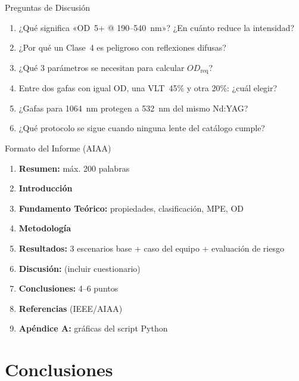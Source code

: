 \documentclass[aspectratio=169,12pt]{beamer}
\begin{document}
\begin{frame}{Preguntas de Discusión}
	\begin{enumerate}
		\item ¿Qué significa «OD~5+ @ 190--540~nm»? ¿En cuánto reduce la intensidad?
		\item ¿Por qué un Clase~4 es peligroso con reflexiones difusas?
		\item ¿Qué 3 parámetros se necesitan para calcular $OD_\mathrm{req}$?
		\item Entre dos gafas con igual OD, una VLT~45\% y otra 20\%: ¿cuál elegir?
		\item ¿Gafas para 1064~nm protegen a 532~nm del mismo Nd:YAG?
		\item ¿Qué protocolo se sigue cuando ninguna lente del catálogo cumple?
	\end{enumerate}
\end{frame}

\begin{frame}{Formato del Informe (AIAA)}
	\begin{enumerate}
		\item \textbf{Resumen:} máx. 200 palabras
		\item \textbf{Introducción}
		\item \textbf{Fundamento Teórico:} propiedades, clasificación, MPE, OD
		\item \textbf{Metodología}
		\item \textbf{Resultados:} 3 escenarios base + caso del equipo + evaluación de riesgo
		\item \textbf{Discusión:} (incluir cuestionario)
		\item \textbf{Conclusiones:} 4--6 puntos
		\item \textbf{Referencias} (IEEE/AIAA)
		\item \textbf{Apéndice A:} gráficas del script Python
	\end{enumerate}
\end{frame}

\section{Conclusiones}
\end{document}
